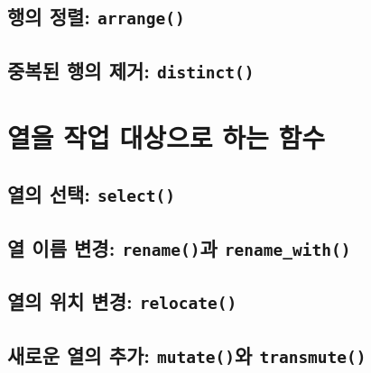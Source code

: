 \documentclass[
]{book}
\begin{document}
\hypertarget{uxd589uxc758-uxc815uxb82c-arrange}{%
\subsection{\texorpdfstring{행의 정렬: \texttt{arrange()}}{행의 정렬: arrange()}}\label{uxd589uxc758-uxc815uxb82c-arrange}}

\hypertarget{uxc911uxbcf5uxb41c-uxd589uxc758-uxc81cuxac70-distinct}{%
\subsection{\texorpdfstring{중복된 행의 제거: \texttt{distinct()}}{중복된 행의 제거: distinct()}}\label{uxc911uxbcf5uxb41c-uxd589uxc758-uxc81cuxac70-distinct}}

\hypertarget{uxc5f4uxc744-uxc791uxc5c5-uxb300uxc0c1uxc73cuxb85c-uxd558uxb294-uxd568uxc218}{%
\section{열을 작업 대상으로 하는 함수}\label{uxc5f4uxc744-uxc791uxc5c5-uxb300uxc0c1uxc73cuxb85c-uxd558uxb294-uxd568uxc218}}

\hypertarget{uxc5f4uxc758-uxc120uxd0dd-select}{%
\subsection{\texorpdfstring{열의 선택: \texttt{select()}}{열의 선택: select()}}\label{uxc5f4uxc758-uxc120uxd0dd-select}}

\hypertarget{uxc5f4-uxc774uxb984-uxbcc0uxacbd-renameuxacfc-rename_with}{%
\subsection{\texorpdfstring{열 이름 변경: \texttt{rename()}과 \texttt{rename\_with()}}{열 이름 변경: rename()과 rename\_with()}}\label{uxc5f4-uxc774uxb984-uxbcc0uxacbd-renameuxacfc-rename_with}}

\hypertarget{uxc5f4uxc758-uxc704uxce58-uxbcc0uxacbd-relocate}{%
\subsection{\texorpdfstring{열의 위치 변경: \texttt{relocate()}}{열의 위치 변경: relocate()}}\label{uxc5f4uxc758-uxc704uxce58-uxbcc0uxacbd-relocate}}

\hypertarget{uxc0c8uxb85cuxc6b4-uxc5f4uxc758-uxcd94uxac00-mutateuxc640-transmute}{%
\subsection{\texorpdfstring{새로운 열의 추가: \texttt{mutate()}와 \texttt{transmute()}}{새로운 열의 추가: mutate()와 transmute()}}\label{uxc0c8uxb85cuxc6b4-uxc5f4uxc758-uxcd94uxac00-mutateuxc640-transmute}}
\end{document}
